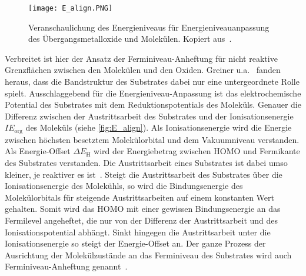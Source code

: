             \begin{figure}
                \centering
                \texttt{[image: E\_align.PNG]}
                \caption{Veranschaulichung des Energieniveaus für Energieniveauanpassung des Übergangsmetalloxide und Molekülen. Kopiert aus~\cite{IF_3}.}
                \label{fig:E_align}
            \end{figure}
            Verbreitet ist hier der Ansatz der Ferminiveau-Anheftung für nicht reaktive Grenzflächen zwischen den Molekülen und den Oxiden.
            Greiner u.a.~\cite{IF_3} fanden heraus, dass die Bandstruktur des Substrates dabei nur eine untergeordnete Rolle spielt.
            Ausschlaggebend für die Energieniveau-Anpassung ist das elektrochemische Potential des Substrates mit dem Reduktionspotentials des Moleküls.
            Genauer die Differenz zwischen der Austrittsarbeit des Substrates und der Ionisationsenergie $IE_\text{org}$ des Moleküls (siehe \autoref{fig:E_align}).
            Als Ionisationsenergie wird die Energie zwischen höchsten besetztem Molekülorbital und dem Vakuumniveau verstanden.
            Als Energie-Offset $\Delta E_\text{H}$ wird der Energiebetrag zwischen HOMO und Fermikante des Substrates verstanden.
            Die Austrittsarbeit eines Substrates ist dabei umso kleiner, je reaktiver es ist~\cite{5A_5}.
            Steigt die Austrittsarbeit des Substrates über die Ionisationsenergie des Molekühls, so wird die Bindungsenergie des Molekülorbitals für steigende Austrittsarbeiten auf einem konstanten Wert gehalten.
            Somit wird das HOMO mit einer gewissen Bindungsenergie an das Fermilevel angeheftet, die nur von der Differenz der Austrittsarbeit und des Ionisationspotential abhängt.
            Sinkt hingegen die Austrittsarbeit unter die Ionisationsenergie so steigt der Energie-Offset an.
            Der ganze Prozess der Ausrichtung der Molekülzustände an das Ferminiveau des Substrates wird auch Ferminiveau-Anheftung genannt~\cite{IF_3}.

